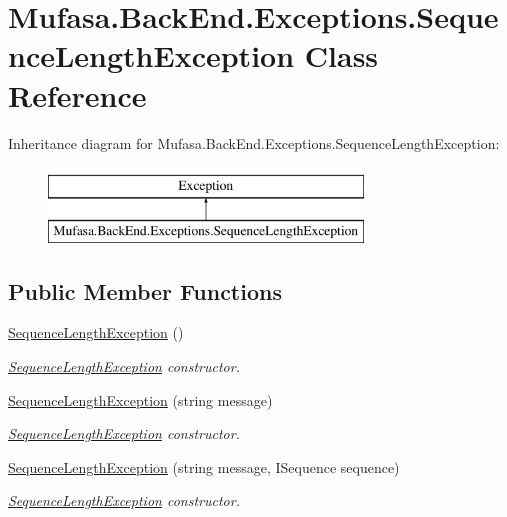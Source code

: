 \hypertarget{class_mufasa_1_1_back_end_1_1_exceptions_1_1_sequence_length_exception}{\section{Mufasa.\+Back\+End.\+Exceptions.\+Sequence\+Length\+Exception Class Reference}
\label{class_mufasa_1_1_back_end_1_1_exceptions_1_1_sequence_length_exception}
}
Inheritance diagram for Mufasa.\+Back\+End.\+Exceptions.\+Sequence\+Length\+Exception\+:\begin{figure}[H]
\begin{center}
\leavevmode
\includegraphics[height=2.000000cm]{class_mufasa_1_1_back_end_1_1_exceptions_1_1_sequence_length_exception}
\end{center}
\end{figure}
\subsection*{Public Member Functions}
\begin{DoxyCompactItemize}
\item 
\hyperlink{class_mufasa_1_1_back_end_1_1_exceptions_1_1_sequence_length_exception_a8e6429f888d625777a07b62f076e2ff7}{Sequence\+Length\+Exception} ()
\begin{DoxyCompactList}\small\item\em \hyperlink{class_mufasa_1_1_back_end_1_1_exceptions_1_1_sequence_length_exception}{Sequence\+Length\+Exception} constructor. \end{DoxyCompactList}\item 
\hyperlink{class_mufasa_1_1_back_end_1_1_exceptions_1_1_sequence_length_exception_a93a95c1b7f6d0214128bea0935ebf8c2}{Sequence\+Length\+Exception} (string message)
\begin{DoxyCompactList}\small\item\em \hyperlink{class_mufasa_1_1_back_end_1_1_exceptions_1_1_sequence_length_exception}{Sequence\+Length\+Exception} constructor. \end{DoxyCompactList}\item 
\hyperlink{class_mufasa_1_1_back_end_1_1_exceptions_1_1_sequence_length_exception_ab69a9738667e974436ffe38e2f038aef}{Sequence\+Length\+Exception} (string message, I\+Sequence sequence)
\begin{DoxyCompactList}\small\item\em \hyperlink{class_mufasa_1_1_back_end_1_1_exceptions_1_1_sequence_length_exception}{Sequence\+Length\+Exception} constructor. \end{DoxyCompactList}\end{DoxyCompactItemize}
